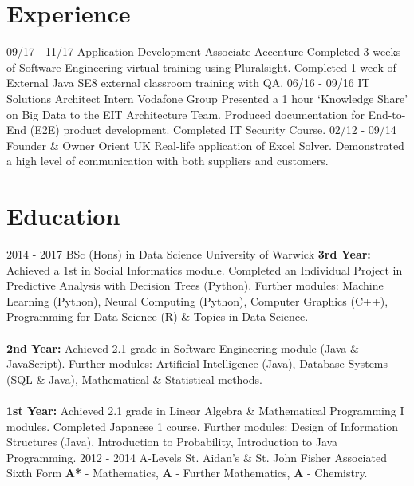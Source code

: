 \documentclass[]{friggeri-cv}
\begin{document}
\section{Experience}
\begin{entrylist}
    \entry
    {09/17 - 11/17}
    {Application Development Associate}
    {Accenture}
    {Completed 3 weeks of Software Engineering virtual training using Pluralsight. Completed 1 week of External Java SE8 external classroom training with QA.}
    \entry
    {06/16 - 09/16}
    {IT Solutions Architect Intern}
    {Vodafone Group}
    {Presented a 1 hour ‘Knowledge Share’ on Big Data to the EIT Architecture Team. Produced documentation for End-to-End (E2E) product development. Completed IT Security Course.}
    \entry
    {02/12 - 09/14}
    {Founder \& Owner}
    {Orient UK}
    {Real-life application of Excel Solver. Demonstrated a high level of communication with both suppliers and customers.}
\end{entrylist}

\section{Education}
\begin{entrylist}
  \entry %
    {2014 - 2017}
    {BSc (Hons) in Data Science}
    {University of Warwick}
    {\textbf{3rd Year:} Achieved a 1st in Social Informatics module. Completed an Individual Project in Predictive Analysis with Decision Trees (Python). Further modules: Machine Learning (Python), Neural Computing (Python), Computer Graphics (C++), Programming for Data Science (R) \& Topics in Data Science.\\\\
    \textbf{2nd Year:} Achieved 2.1 grade in Software Engineering module (Java \& JavaScript). Further modules: Artificial Intelligence (Java), Database Systems (SQL \& Java), Mathematical \& Statistical methods.\\\\
    \textbf{1st Year:} Achieved 2.1 grade in Linear Algebra \& Mathematical Programming I modules. Completed Japanese 1 course. Further modules: Design of Information Structures (Java), Introduction to Probability, Introduction to Java Programming.}
  \entry %
    {2012 - 2014}
    {A-Levels}
    {St. Aidan's \& St. John Fisher Associated Sixth Form}
    {\textbf{A*} - Mathematics, \textbf{A} - Further Mathematics, \textbf{A} - Chemistry.}
\end{entrylist}
\end{document}
